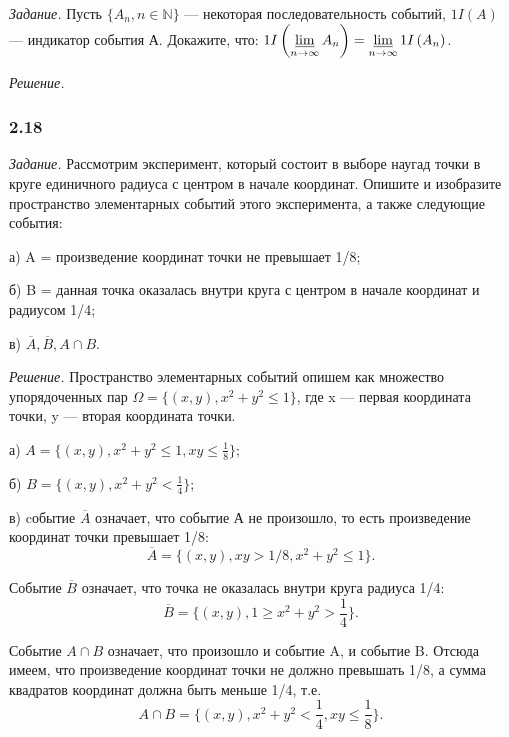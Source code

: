 \documentclass{book}
\begin{document}
\textit{Задание.} Пусть $\{A_n, n\in\mathbb{N}\}$ --- некоторая последовательность событий, $1I(A)$ --- индикатор события А. Докажите, что: $1I\left(\varliminf\limits_{n\to\infty}A_n\right)=\varliminf\limits_{n\to\infty}1I\left(A_n\right)$.

\textit{Решение.}

\subsubsection*{2.18}

\textit{Задание.} Рассмотрим эксперимент, который состоит в выборе наугад точки в круге единичного радиуса с центром в начале координат. Опишите и изобразите пространство элементарных событий этого эксперимента, а также следующие события:

а) A = {произведение координат точки не превышает 1/8};

б) B = {данная точка оказалась внутри круга с центром в начале координат и радиусом 1/4};

в) $\overline{A}, \overline{B}, A\cap B$.

\textit{Решение.} Пространство элементарных событий опишем как множество упорядоченных пар $\Omega=\{(x, y), x^2+y^2\leq 1\}$, где x --- первая координата точки, y --- вторая координата точки.

а) $A=\{(x, y), x^2+y^2\leq 1, xy\leq\frac{1}{8}\}$;

б) $B=\{(x, y), x^2+y^2<\frac{1}{4}\}$;

в) cобытие $\overline{A}$ означает, что событие А не произошло, то есть произведение координат точки превышает 1/8: $$\overline{A}=\{(x, y), xy>1/8, x^2+y^2\leq 1\}.$$

Событие $\overline{B}$ означает, что точка не оказалась внутри круга радиуса 1/4: $$\overline{B}=\{(x, y), 1\geq x^2+y^2>\frac{1}{4}\}.$$

Событие $A\cap B$ означает, что произошло и событие A, и событие B. Отсюда имеем, что произведение координат точки не должно превышать 1/8, а сумма квадратов координат должна быть меньше 1/4, т.е. $$A\cap B=\{(x, y), x^2+y^2<\frac{1}{4}, xy\leq\frac{1}{8}\}.$$
\end{document}
